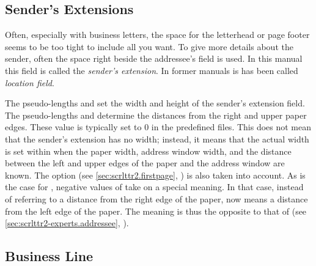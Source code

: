 \subsection{Sender's Extensions}
\BeginIndexGroup
{}

Often, especially with business letters, the space for the letterhead or page
footer seems to be too tight to include all you want. To give more details
about the sender, often the space right beside the addressee's field is
used. In this manual this field is called the \emph{sender's extension}. In
former manuals is has been called \emph{location field}.

\begin{Declaration}
\end{Declaration}
The pseudo-lengths  and
 set the width and
height of the sender's extension field. The pseudo-lengths 
and  determine the distances from the right and upper paper
edges. These value is typically set to 0 in the predefined 
files. This does not mean that the sender's extension has
no width; instead, it means that the actual width is set within 
when the paper width, address window width, and the distance between the left
and upper edges of the paper and the address window are known. The option
 (see \autoref{sec:scrlttr2.firstpage},
) is also taken into account. As is
the case for , negative values of  take
on a special meaning. In that case, instead of referring to a distance from
the right edge of the paper,  now means a distance from the
left edge of the paper. The meaning is thus the opposite to that of
 (see \autoref{sec:scrlttr2-experts.addressee},
).%
%
\EndIndexGroup
%
\EndIndexGroup


\subsection{Business Line}
%
\BeginIndexGroup
{}

